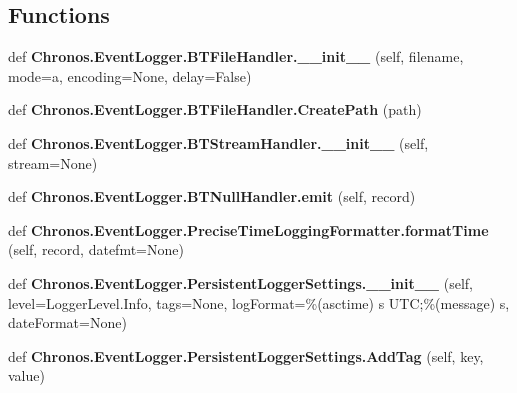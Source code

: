 \subsection*{Functions}
\begin{DoxyCompactItemize}
\item 
def {\bfseries Chronos.\+Event\+Logger.\+B\+T\+File\+Handler.\+\_\+\+\_\+init\+\_\+\+\_\+} (self, filename, mode=\textquotesingle{}a\textquotesingle{}, encoding=None, delay=False)\hypertarget{group__PyInfrastructure_ga4728151ae2d279803ded69ee9ff10a0a}{}\label{group__PyInfrastructure_ga4728151ae2d279803ded69ee9ff10a0a}

\item 
def {\bfseries Chronos.\+Event\+Logger.\+B\+T\+File\+Handler.\+Create\+Path} (path)\hypertarget{group__PyInfrastructure_ga67bb768f5c8b83697a8c3b86d4957e74}{}\label{group__PyInfrastructure_ga67bb768f5c8b83697a8c3b86d4957e74}

\item 
def {\bfseries Chronos.\+Event\+Logger.\+B\+T\+Stream\+Handler.\+\_\+\+\_\+init\+\_\+\+\_\+} (self, stream=None)\hypertarget{group__PyInfrastructure_ga9bb7c7ae075214c894de22949e5800c8}{}\label{group__PyInfrastructure_ga9bb7c7ae075214c894de22949e5800c8}

\item 
def {\bfseries Chronos.\+Event\+Logger.\+B\+T\+Null\+Handler.\+emit} (self, record)\hypertarget{group__PyInfrastructure_ga7fbc9008dbf687809ad7a274069536c1}{}\label{group__PyInfrastructure_ga7fbc9008dbf687809ad7a274069536c1}

\item 
def {\bfseries Chronos.\+Event\+Logger.\+Precise\+Time\+Logging\+Formatter.\+format\+Time} (self, record, datefmt=None)\hypertarget{group__PyInfrastructure_ga6da4d879e87ab927a0d39aec5024cf2e}{}\label{group__PyInfrastructure_ga6da4d879e87ab927a0d39aec5024cf2e}

\item 
def {\bfseries Chronos.\+Event\+Logger.\+Persistent\+Logger\+Settings.\+\_\+\+\_\+init\+\_\+\+\_\+} (self, level=Logger\+Level.\+Info, tags=None, log\+Format=\textquotesingle{}\%(asctime) s U\+TC;\%(message) s\textquotesingle{}, date\+Format=None)\hypertarget{group__PyInfrastructure_ga486a44233539370fc15260c1e283c7f9}{}\label{group__PyInfrastructure_ga486a44233539370fc15260c1e283c7f9}

\item 
def {\bfseries Chronos.\+Event\+Logger.\+Persistent\+Logger\+Settings.\+Add\+Tag} (self, key, value)\hypertarget{group__PyInfrastructure_ga4ffa5852c239b0213bc19b39aa094da3}{}\label{group__PyInfrastructure_ga4ffa5852c239b0213bc19b39aa094da3}


\end{DoxyCompactItemize}
